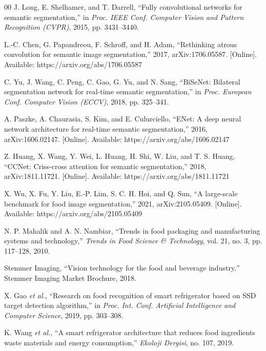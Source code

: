 \begin{thebibliography}{00}
J. Long, E. Shelhamer, and T. Darrell, ``Fully convolutional networks for semantic segmentation,'' in \textit{Proc. IEEE Conf. Computer Vision and Pattern Recognition (CVPR)}, 2015, pp. 3431--3440.

L.-C. Chen, G. Papandreou, F. Schroff, and H. Adam, ``Rethinking atrous convolution for semantic image segmentation,'' 2017, arXiv:1706.05587. [Online]. Available: https://arxiv.org/abs/1706.05587

C. Yu, J. Wang, C. Peng, C. Gao, G. Yu, and N. Sang, ``BiSeNet: Bilateral segmentation network for real-time semantic segmentation,'' in \textit{Proc. European Conf. Computer Vision (ECCV)}, 2018, pp. 325--341.

A. Paszke, A. Chaurasia, S. Kim, and E. Culurciello, ``ENet: A deep neural network architecture for real-time semantic segmentation,'' 2016, arXiv:1606.02147. [Online]. Available: https://arxiv.org/abs/1606.02147

Z. Huang, X. Wang, Y. Wei, L. Huang, H. Shi, W. Liu, and T. S. Huang, ``CCNet: Criss-cross attention for semantic segmentation,'' 2018, arXiv:1811.11721. [Online]. Available: https://arxiv.org/abs/1811.11721

X. Wu, X. Fu, Y. Liu, E.-P. Lim, S. C. H. Hoi, and Q. Sun, ``A large-scale benchmark for food image segmentation,'' 2021, arXiv:2105.05409. [Online]. Available: https://arxiv.org/abs/2105.05409

N. P. Mahalik and A. N. Nambiar, ``Trends in food packaging and manufacturing systems and technology,'' \textit{Trends in Food Science \& Technology}, vol. 21, no. 3, pp. 117--128, 2010.

Stemmer Imaging, ``Vision technology for the food and beverage industry,'' Stemmer Imaging Market Brochure, 2018.

X. Gao \textit{et al.}, ``Research on food recognition of smart refrigerator based on SSD target detection algorithm,'' in \textit{Proc. Int. Conf. Artificial Intelligence and Computer Science}, 2019, pp. 303--308.

K. Wang \textit{et al.}, ``A smart refrigerator architecture that reduces food ingredients waste materials and energy consumption,'' \textit{Ekoloji Dergisi}, no. 107, 2019.


\end{thebibliography}

